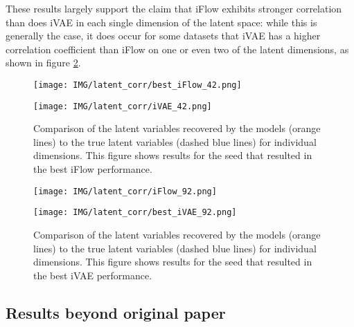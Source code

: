 These results largely support the claim that iFlow exhibits stronger correlation than does iVAE in each single dimension of the latent space: while this is generally the case, it does occur for some datasets that iVAE has a higher correlation coefficient than iFlow on one or even two of the latent dimensions, as shown in figure \ref{fig:latentcorr2}.

\begin{figure}[!htbp]
    \centering
    \begin{minipage}[b]{\textwidth}
        \centering
       \texttt{[image: IMG/latent\_corr/best\_iFlow\_42.png]}
    \end{minipage}
    \begin{minipage}[b]{\textwidth}
    \centering
       \texttt{[image: IMG/latent\_corr/iVAE\_42.png]}
    \end{minipage}
    \caption{Comparison of the latent variables recovered by the models (orange lines) to the true latent variables (dashed blue lines) for individual dimensions. This figure shows results for the seed that resulted in the best iFlow performance.}
    \label{fig:latentcorr1}
\end{figure}

\begin{figure}[!htbp]
    \centering
    \begin{minipage}[b]{\textwidth}
        \centering
       \texttt{[image: IMG/latent\_corr/iFlow\_92.png]}
    \end{minipage}
    \begin{minipage}[b]{\textwidth}
    \centering
       \texttt{[image: IMG/latent\_corr/best\_iVAE\_92.png]}
    \end{minipage}
    \caption{Comparison of the latent variables recovered by the models (orange lines) to the true latent variables (dashed blue lines) for individual dimensions. This figure shows results for the seed that resulted in the best iVAE performance.}
    \label{fig:latentcorr2}
\end{figure}

\newpage

\subsection{Results beyond original paper}
 
